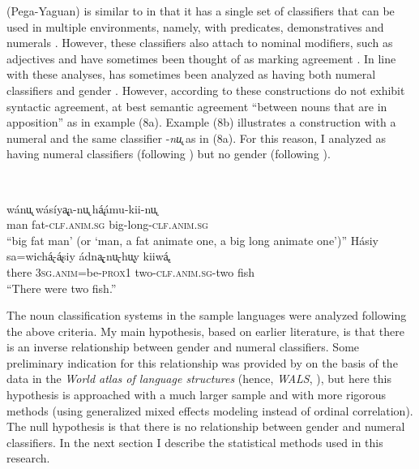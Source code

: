 \documentclass[output=collectionpaper]{langsci/langscibook}
\begin{document}
 (Pega-Yaguan) is similar to  in that it has a single set of classifiers that can be used in multiple environments, namely, with predicates, demonstratives and numerals \citep{Payne2007}. However, these classifiers also attach to nominal modifiers, such as adjectives and have sometimes been thought of as marking agreement \citep[217]{Aikhenvald2000}. In line with these analyses,  has sometimes been analyzed as having both numeral classifiers and gender \citep[136--137]{Nichols1992}. However, according to \citet{Payne2007} these constructions do not exhibit syntactic agreement, at best semantic agreement ``between nouns that are in apposition'' as in example (8a). Example (8b) illustrates a construction with a numeral and the same classifier -\textit{nu̢} as in (8a). For this reason, I analyzed  as having numeral classifiers (following \citealt{Gil2013}) but no gender (following \citealt{Payne2007}).

\ea
\label{ex:Sinne:8}
\\
\begin{xlist}
\ex
\gll wánu̢ wásíya̢̢a-nu̢ há̢ámu-kii-nu̢\\
man fat-\textsc{clf.anim.sg} big-long\textsc{{}-clf.anim.sg}\\
\glt ``big fat man' (or `man, a fat animate one, a big long animate one')''
\ex
\gll Hásiy sa=wichá̢-á̢siy ádna̢̢-nu̢-hu̢y kiiwá̢.\\
there 3\textsc{sg.anim}=be-\textsc{prox1} two-\textsc{clf.anim.sg}{}-two fish\\
\glt ``There were two fish.''\\
\end{xlist}
\z

The noun classification systems in the sample languages were analyzed following the above criteria. My main hypothesis, based on earlier literature, is that there is an inverse relationship between gender and numeral classifiers. Some preliminary indication for this relationship was provided by \citet[188--189]{Sinnemaeki2014a} on the basis of the data in the \textit{World atlas of language structures} (hence, \textit{WALS}, \citealt{Dryer2013}), but here this hypothesis is approached with a much larger sample and with more rigorous methods (using generalized mixed effects modeling instead of ordinal correlation). The null hypothesis is that there is no relationship between gender and numeral classifiers. In the next section I describe the statistical methods used in this research.
\end{document}

